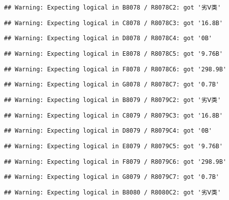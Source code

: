 \documentclass[
]{article}
\begin{document}
\begin{verbatim}
## Warning: Expecting logical in B8078 / R8078C2: got '劣Ⅴ类'
\end{verbatim}

\begin{verbatim}
## Warning: Expecting logical in C8078 / R8078C3: got '16.8B'
\end{verbatim}

\begin{verbatim}
## Warning: Expecting logical in D8078 / R8078C4: got '0B'
\end{verbatim}

\begin{verbatim}
## Warning: Expecting logical in E8078 / R8078C5: got '9.76B'
\end{verbatim}

\begin{verbatim}
## Warning: Expecting logical in F8078 / R8078C6: got '298.9B'
\end{verbatim}

\begin{verbatim}
## Warning: Expecting logical in G8078 / R8078C7: got '0.7B'
\end{verbatim}

\begin{verbatim}
## Warning: Expecting logical in B8079 / R8079C2: got '劣Ⅴ类'
\end{verbatim}

\begin{verbatim}
## Warning: Expecting logical in C8079 / R8079C3: got '16.8B'
\end{verbatim}

\begin{verbatim}
## Warning: Expecting logical in D8079 / R8079C4: got '0B'
\end{verbatim}

\begin{verbatim}
## Warning: Expecting logical in E8079 / R8079C5: got '9.76B'
\end{verbatim}

\begin{verbatim}
## Warning: Expecting logical in F8079 / R8079C6: got '298.9B'
\end{verbatim}

\begin{verbatim}
## Warning: Expecting logical in G8079 / R8079C7: got '0.7B'
\end{verbatim}

\begin{verbatim}
## Warning: Expecting logical in B8080 / R8080C2: got '劣Ⅴ类'
\end{verbatim}
\end{document}
